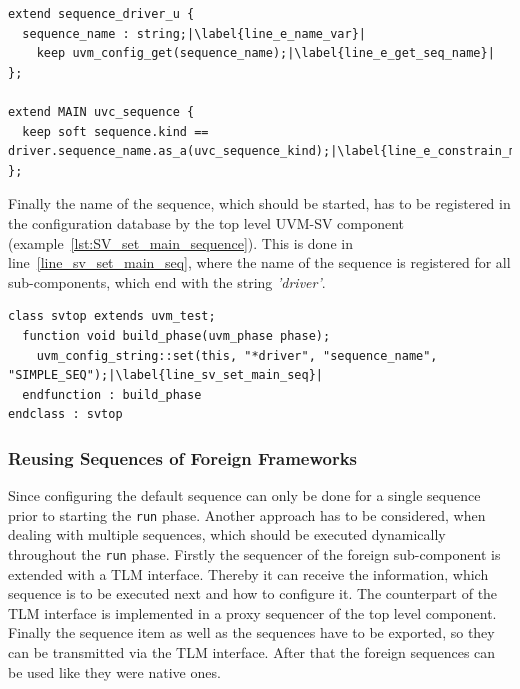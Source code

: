 \lstset{language=e, numbers = left, escapechar=|, breaklines=true}
\begin{lstlisting}[frame=htrbl, caption={\textit{e}: getting the \lstinline$main$ sequence from configuration database},
label={lst:e_get_main_sequence}]
extend sequence_driver_u {
  sequence_name : string;|\label{line_e_name_var}|
    keep uvm_config_get(sequence_name);|\label{line_e_get_seq_name}|
};

extend MAIN uvc_sequence {
  keep soft sequence.kind == driver.sequence_name.as_a(uvc_sequence_kind);|\label{line_e_constrain_main_seq}|
};
\end{lstlisting}
Finally the name of the sequence, which should be started, has to be registered in the configuration database by the top level UVM-SV component (example~\ref{lst:SV_set_main_sequence}). This is done in line~\ref{line_sv_set_main_seq}, where the name of the sequence is registered for all sub-components, which end with the string \emph{'driver'}.
\lstset{language=SystemVerilog, numbers = left, escapechar=|, breaklines=true}
\begin{lstlisting}[frame=htrbl, caption={SystemVerilog: setting the \lstinline$main$ sequence via configuration database},
label={lst:SV_set_main_sequence}]
class svtop extends uvm_test;
  function void build_phase(uvm_phase phase);
    uvm_config_string::set(this, "*driver", "sequence_name", "SIMPLE_SEQ");|\label{line_sv_set_main_seq}|
  endfunction : build_phase
endclass : svtop
\end{lstlisting}
\subsubsection{Reusing Sequences of Foreign Frameworks}
Since configuring the default sequence can only be done for a single sequence prior to starting the \lstinline$run$ phase. Another approach has to be considered, when dealing with multiple sequences, which should be executed dynamically throughout the \lstinline$run$ phase. Firstly the sequencer of the foreign sub-component is extended with a TLM interface. Thereby it can receive the information, which sequence is to be executed next and how to configure it. The counterpart of the TLM interface is implemented in a proxy sequencer of the top level component. Finally the sequence item as well as the sequences have to be exported, so they can be transmitted via the TLM interface. After that the foreign sequences can be used like they were native ones.
